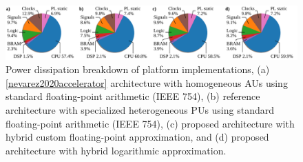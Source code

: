 \begin{figure}[b!]
	\centering
	\includegraphics[width=\columnwidth]{./chapters/sbs_accelerator/figures/platform_power_dissipation_breakdown.pdf}
	\caption{Power dissipation breakdown of platform implementations, (a) \ref{nevarez2020accelerator} architecture with homogeneous AUs using standard floating-point arithmetic (IEEE 754), (b) reference architecture with specialized heterogeneous PUs using standard floating-point arithmetic (IEEE 754), (c) proposed architecture with hybrid custom floating-point approximation, and (d) proposed architecture with hybrid logarithmic approximation.}
	\label{fig:platform_power_dissipation_breakdown}
\end{figure}